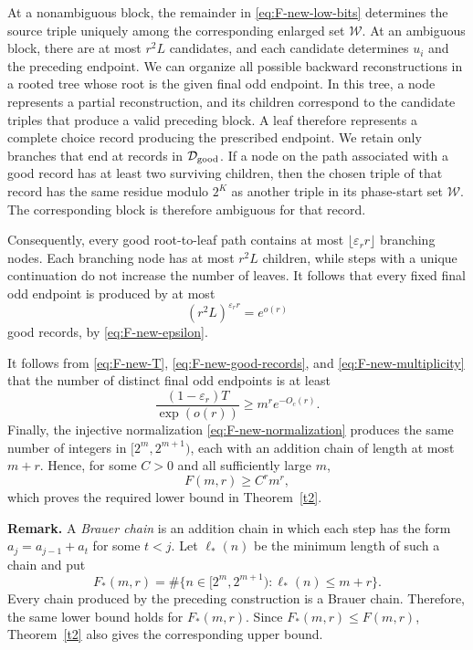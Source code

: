 \documentclass{article}
\theoremstyle{definition}
\begin{document}
At a nonambiguous block, the remainder in \eqref{eq:F-new-low-bits} determines
the source triple uniquely among the corresponding enlarged set $\mathcal W$.
At an ambiguous block, there are at most $r^2L$ candidates, and each candidate
determines $u_i$ and the preceding endpoint.  We can organize all possible backward reconstructions in a rooted tree whose root is
the given final odd endpoint.  In this tree, a node represents a partial reconstruction,
and its children correspond to the candidate triples that produce a valid
preceding block.  A leaf therefore represents a complete choice record
producing the prescribed endpoint. 
 We retain only branches that end at records in $\mathcal D_{\rm good}$.  If a
node on the path associated with a good record has at least two surviving
children, then the chosen triple of that record has the same residue modulo
$2^K$ as another triple in its phase-start set $\mathcal W$.  The
corresponding block is therefore ambiguous for that record.

Consequently, every good root-to-leaf path contains at most
$\lfloor \varepsilon_rr\rfloor$ branching nodes.  Each branching node has at most $r^2L$
children, while steps with a unique continuation do not increase the number
of leaves.  It follows that every fixed final odd endpoint is produced by at
most
\begin{equation}
 (r^2L)^{\varepsilon_rr}=e^{o(r)}
 \label{eq:F-new-multiplicity}
\end{equation}
good records, by \eqref{eq:F-new-epsilon}.

It follows from \eqref{eq:F-new-T}, \eqref{eq:F-new-good-records}, and
\eqref{eq:F-new-multiplicity} that the number of distinct final odd endpoints
is at least
$$
 \frac{(1-\varepsilon_r)T}{\exp(o(r))}
 \geq m^re^{-O_c(r)}.
$$
Finally, the injective normalization \eqref{eq:F-new-normalization} produces
the same number of integers in $[2^m,2^{m+1})$, each with an addition chain of
length at most $m+r$.  Hence, for some $C>0$ and all sufficiently large
$m$,
$$
 F(m,r)\geq C^rm^r,
$$
which proves the required lower bound in Theorem~\ref{t2}.


\medskip
\noindent
\textbf{Remark.}
A \emph{Brauer chain} is an addition chain in which
each step has the form $a_j=a_{j-1}+a_t$ for some $t<j$.
Let $\ell_*(n)$ be the minimum length of such a chain and put
$$
 F_*(m,r)=\#\{n\in[2^m,2^{m+1}):\ell_*(n)\leq m+r\}.
$$
Every chain produced by the preceding construction is a Brauer chain. Therefore, the same
lower bound holds for $F_*(m,r)$. Since $F_*(m,r)\leq F(m,r)$, Theorem~\ref{t2}
also gives the corresponding upper bound.
\end{document}
